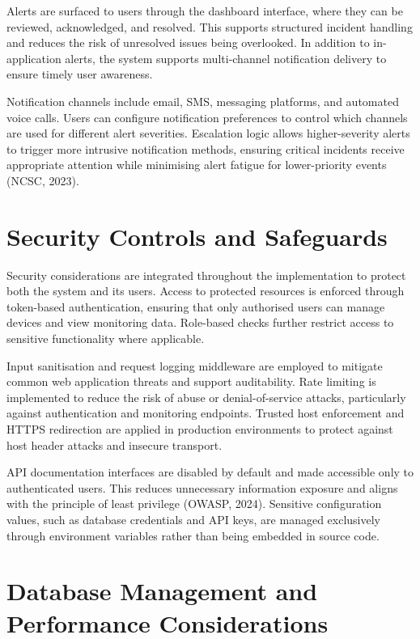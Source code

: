 Alerts are surfaced to users through the dashboard interface, where they can be reviewed, acknowledged, and resolved. This supports structured incident handling and reduces the risk of unresolved issues being overlooked. In addition to in-application alerts, the system supports multi-channel notification delivery to ensure timely user awareness.

Notification channels include email, SMS, messaging platforms, and automated voice calls. Users can configure notification preferences to control which channels are used for different alert severities. Escalation logic allows higher-severity alerts to trigger more intrusive notification methods, ensuring critical incidents receive appropriate attention while minimising alert fatigue for lower-priority events (NCSC, 2023).

\section{Security Controls and Safeguards}

Security considerations are integrated throughout the implementation to protect both the system and its users. Access to protected resources is enforced through token-based authentication, ensuring that only authorised users can manage devices and view monitoring data. Role-based checks further restrict access to sensitive functionality where applicable.

Input sanitisation and request logging middleware are employed to mitigate common web application threats and support auditability. Rate limiting is implemented to reduce the risk of abuse or denial-of-service attacks, particularly against authentication and monitoring endpoints. Trusted host enforcement and HTTPS redirection are applied in production environments to protect against host header attacks and insecure transport.

API documentation interfaces are disabled by default and made accessible only to authenticated users. This reduces unnecessary information exposure and aligns with the principle of least privilege (OWASP, 2024). Sensitive configuration values, such as database credentials and API keys, are managed exclusively through environment variables rather than being embedded in source code.

\section{Database Management and Performance Considerations}

